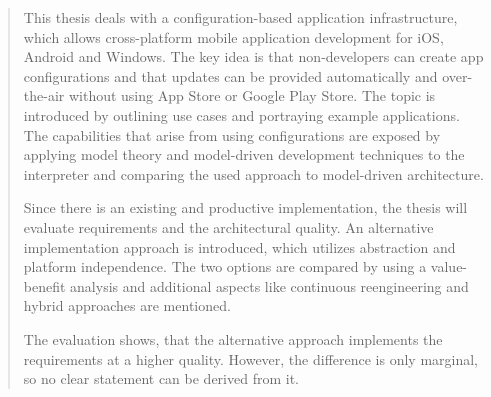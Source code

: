 





 
\begin{abstract}

This thesis deals with a configuration-based application infrastructure, which allows cross-platform mobile application development for iOS, Android and Windows.
The key idea is that non-developers can create app configurations and that updates can be provided automatically and over-the-air without using App Store or Google Play Store.
The topic is introduced by outlining use cases and portraying example applications.
The capabilities that arise from using configurations are exposed by applying model theory and model-driven development techniques to the interpreter and comparing the used approach to model-driven architecture.

Since there is an existing and productive implementation, the thesis will evaluate requirements and the architectural quality.
An alternative implementation approach is introduced, which utilizes abstraction and platform independence.
The two options are compared by using a value-benefit analysis and additional aspects like continuous reengineering and hybrid approaches are mentioned.

The evaluation shows, that the alternative approach implements the requirements at a higher quality.
However, the difference is only marginal, so no clear statement can be derived from it.



\end{abstract}
\cleardoublepage